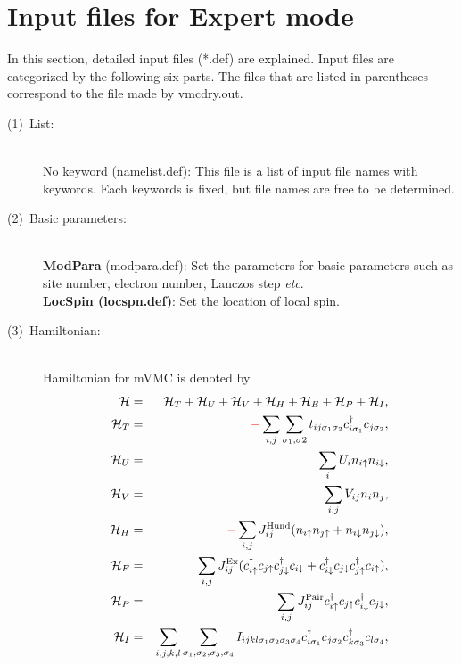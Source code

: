 \newpage
\section{Input files for Expert mode}
\label{Ch:HowToExpert}
In this section, detailed input files (*.def) are explained. Input files are categorized by the following six parts.
The files that are listed in parentheses correspond to the file made by vmcdry.out.

\begin{description}
\item[(1)~List:]
~\\{No keyword} (namelist.def):
This file is a list of input file names with keywords. Each keywords is fixed, but file names are free to be determined.  
\item[(2)~Basic parameters:]
~\\{\bf ModPara} (modpara.def): Set the parameters for basic parameters such as site number, electron number, Lanczos step {\it etc}.
~\\{\bf LocSpin (locspn.def)}: Set the location of local spin. 
\item[(3)~Hamiltonian:] 
~\\Hamiltonian for mVMC is denoted by 
\begin{eqnarray}
{\cal H}&=&{\cal H}_T+{\cal H}_U+{\cal H}_V+{\cal H}_H+{\cal H}_E+{\cal H}_P+{\cal H}_I,\\
{\cal H}_T&=&\tr{-}\sum_{i, j}\sum_{\sigma_1, \sigma2}t_{ij\sigma_1\sigma_2} c_{i\sigma_1}^{\dag}c_{j\sigma_2},\\
{\cal H}_U&=&\sum_{i} U_i n_ {i \uparrow}n_{i \downarrow},\\
{\cal H}_V&=&\sum_{i,j} V_{ij}n_ {i}n_{j},\\
{\cal H}_H&=&\tr{-}\sum_{i,j}J_{ij}^{\rm Hund} (n_{i\uparrow}n_{j\uparrow}+n_{i\downarrow}n_{j\downarrow}),\\
{\cal H}_E&=&\sum_{i,j}J_{ij}^{\rm Ex} (c_ {i \uparrow}^{\dag}c_{j\uparrow}c_{j \downarrow}^{\dag}c_{i  \downarrow}+c_ {i \downarrow}^{\dag}c_{j\downarrow}c_{j \uparrow}^{\dag}c_{i  \uparrow}),\\
{\cal H}_P&=&\sum_{i,j}J_{ij}^{\rm Pair} c_ {i \uparrow}^{\dag}c_{j\uparrow}c_{i \downarrow}^{\dag}c_{j  \downarrow},\\
{\cal H}_I&=&\sum_{i,j,k,l}\sum_{\sigma_1,\sigma_2, \sigma_3, \sigma_4}
I_{ijkl\sigma_1\sigma_2\sigma_3\sigma_4}c_{i\sigma_1}^{\dagger}c_{j\sigma_2}c_{k\sigma_3}^{\dagger}c_{l\sigma_4}, 

\end{eqnarray}
\end{description}
